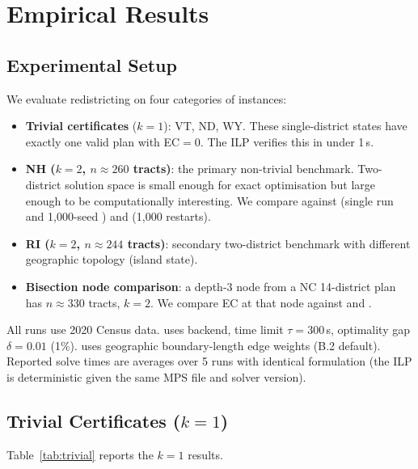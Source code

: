 \section{Empirical Results}
\label{sec:results}

\subsection{Experimental Setup}

We evaluate \ilp{} redistricting on four categories of instances:

\begin{itemize}
\item \textbf{Trivial certificates} ($k=1$): VT, ND, WY.
  These single-district states have exactly one valid plan with EC$= 0$.
  The ILP verifies this in under 1\,s.

\item \textbf{NH ($k=2$, $n \approx 260$ tracts)}: the primary
  non-trivial benchmark.
  Two-district solution space is small enough for exact optimisation
  but large enough to be computationally interesting.
  We compare \ilp{} against \metis{} (single run and 1{,}000-seed \be{})
  and \sa{} (1{,}000 restarts).

\item \textbf{RI ($k=2$, $n \approx 244$ tracts)}: secondary two-district
  benchmark with different geographic topology (island state).

\item \textbf{Bisection node comparison}: a depth-3 node from a NC
  14-district plan has $n \approx 330$ tracts, $k=2$.
  We compare \ilp{} EC at that node against \metis{} and \sa{}.
\end{itemize}

All runs use 2020 Census data.
\ilp{} uses \glpk{} backend, time limit $\tau = 300$\,s, optimality gap
$\delta = 0.01$ (1\%).
\metis{} uses geographic boundary-length edge weights (B.2 default).
Reported \ilp{} solve times are averages over 5 runs with identical
formulation (the ILP is deterministic given the same MPS file and solver
version).

\subsection{Trivial Certificates ($k=1$)}

Table~\ref{tab:trivial} reports the $k=1$ results.

